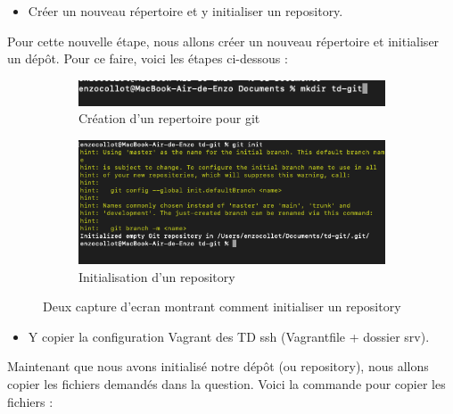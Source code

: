 \documentclass[12pt]{article}
\begin{document}
\vspace{0.3cm}

\begin{itemize}
  \item Créer un nouveau répertoire et y initialiser un repository.
\end{itemize}

Pour cette nouvelle étape, nous allons créer un nouveau répertoire et initialiser un dépôt. Pour ce faire, voici les étapes ci-dessous :

\vspace{0.3cm}

\begin{figure}[h]
  \centering
  \begin{subfigure}{0.30\textwidth}
    \centering
    \includegraphics[width=\textwidth]{Image-TD-Git-1/new-directory.png}
    \caption{Création d'un repertoire pour git}
  \end{subfigure}
  \vspace{0.9cm} %
  \begin{subfigure}{0.45\textwidth}
    \centering
    \includegraphics[width=\textwidth]{Image-TD-Git-1/git-init.png}
    \caption{Initialisation d'un repository}
  \end{subfigure}
  \caption{Deux capture d'ecran montrant comment initialiser un repository}
\end{figure}

\vspace{0.3cm}

\begin{itemize}
  \item Y copier la configuration Vagrant des TD ssh (Vagrantfile + dossier srv).
\end{itemize}

Maintenant que nous avons initialisé notre dépôt (ou repository), nous allons copier les fichiers demandés dans la question. Voici la commande pour copier les fichiers :
\end{document}
